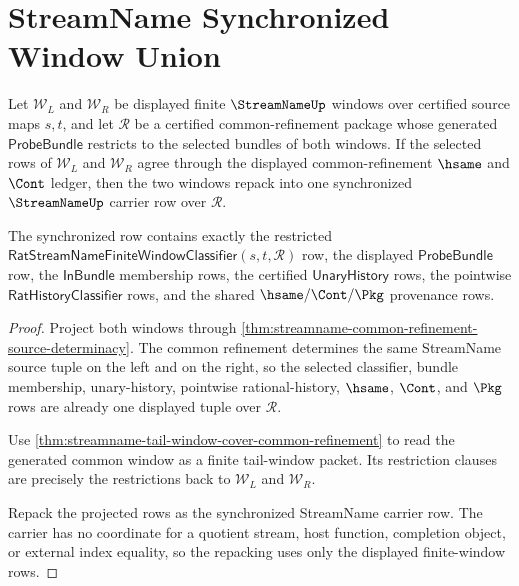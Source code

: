 \section{StreamName Synchronized Window Union}
\label{sec:streamname-synchronized-window-union}

\begin{theorem}
\label{thm:streamname-synchronized-window-union-carrier}
Let $\mathcal W_L$ and $\mathcal W_R$ be displayed finite
$\StreamNameUp$ windows over certified source maps $s,t$, and let
$\mathcal R$ be a certified common-refinement package whose generated
$\mathsf{ProbeBundle}$ restricts to the selected bundles of both windows. If
the selected rows of $\mathcal W_L$ and $\mathcal W_R$ agree through the
displayed common-refinement $\hsame$ and $\Cont$ ledger, then the two windows
repack into one synchronized $\StreamNameUp$ carrier row over $\mathcal R$.

The synchronized row contains exactly the restricted
$\mathsf{RatStreamNameFiniteWindowClassifier}(s,t,\mathcal R)$ row, the
displayed $\mathsf{ProbeBundle}$ row, the $\mathsf{InBundle}$ membership
rows, the certified $\mathsf{UnaryHistory}$ rows, the pointwise
$\mathsf{RatHistoryClassifier}$ rows, and the shared $\hsame/\Cont/\Pkg$
provenance rows.
\end{theorem}
\begin{proof}
Project both windows through
\autoref{thm:streamname-common-refinement-source-determinacy}. The common
refinement determines the same StreamName source tuple on the left and on the
right, so the selected classifier, bundle membership, unary-history, pointwise
rational-history, $\hsame$, $\Cont$, and $\Pkg$ rows are already one displayed
tuple over $\mathcal R$.

Use \autoref{thm:streamname-tail-window-cover-common-refinement} to read the
generated common window as a finite tail-window packet. Its restriction
clauses are precisely the restrictions back to $\mathcal W_L$ and
$\mathcal W_R$.

Repack the projected rows as the synchronized StreamName carrier row. The
carrier has no coordinate for a quotient stream, host function, completion
object, or external index equality, so the repacking uses only the displayed
finite-window rows.
\end{proof}

